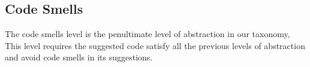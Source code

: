 \subsection{Code Smells}
The code smells level is the penultimate level of abstraction in our taxonomy, This level requires the suggested code satisfy all the previous levels of abstraction and avoid code smells in its suggestions.

